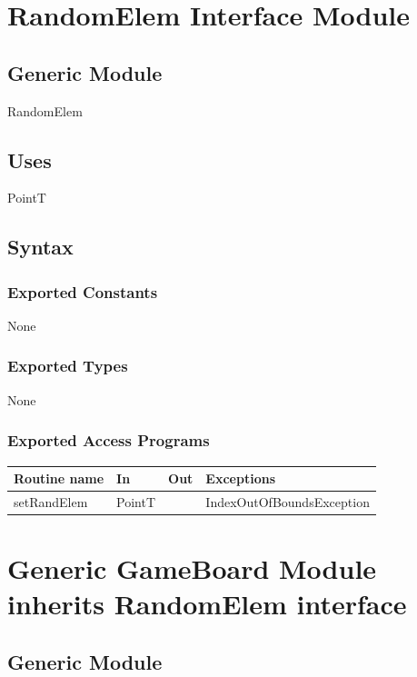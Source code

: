 \documentclass[12pt]{article}
\begin{document}
\newpage

\section* {RandomElem Interface Module}

\subsection*{Generic Module}

RandomElem

\subsection* {Uses}

PointT

\subsection* {Syntax}

\subsubsection* {Exported Constants}

None

\subsubsection* {Exported Types}

None
\subsubsection* {Exported Access Programs}

\begin{tabular}{| l | l | l | p{5.5cm} |}
\hline
\textbf{Routine name} & \textbf{In} & \textbf{Out} & \textbf{Exceptions}\\
\hline
setRandElem & PointT &  &IndexOutOfBoundsException\\
\hline
\end{tabular}

\newpage

\section* {Generic GameBoard Module inherits RandomElem interface}

\subsection*{Generic Module}
\end{document}

